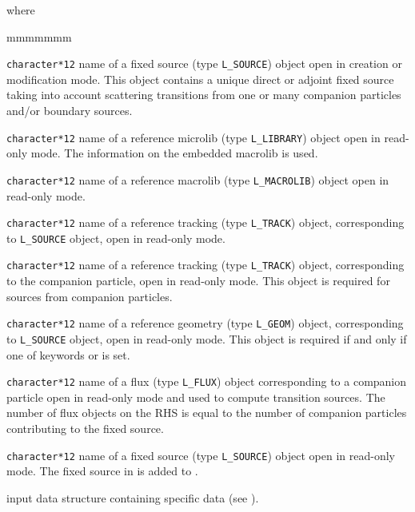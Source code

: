 \noindent where
\begin{ListeDeDescription}{mmmmmmm}

\item[\dusa{SOURCE}] {\tt character*12} name of a {\sc fixed source} (type {\tt L\_SOURCE}) object open in creation or modification
mode. This object contains a unique direct or adjoint fixed source taking into account scattering transitions from one or many companion particles and/or boundary sources.

\item[\dusa{MICRO}] {\tt character*12} name of a reference {\sc microlib} (type {\tt L\_LIBRARY}) object open in read-only mode. The information on
the embedded macrolib is used.

\item[\dusa{MACRO}] {\tt character*12} name of a reference {\sc macrolib} (type {\tt L\_MACROLIB}) object open in read-only mode.

\item[\dusa{TRACK}] {\tt character*12} name of a reference {\sc tracking} (type {\tt L\_TRACK}) object, corresponding to {\tt L\_SOURCE} object, open in read-only mode.

\item[\dusa{TRACK2}] {\tt character*12} name of a reference {\sc tracking} (type {\tt L\_TRACK}) object, corresponding to the companion particle, open in read-only mode. This object is required for sources from companion particles.

\item[\dusa{GEONAM}] {\tt character*12} name of a reference {\sc geometry} (type {\tt L\_GEOM}) object, corresponding to {\tt L\_SOURCE} object, open in read-only mode. This
object is required if and only if one of keywords  or  is set.

\item[\dusa{FLUX}] {\tt character*12} name of a {\sc flux} (type {\tt L\_FLUX}) object corresponding to a companion particle open in read-only mode and used to
compute transition sources. The number of {\sc flux} objects on the RHS is equal to the number of companion particles contributing to the fixed source.

\item[\dusa{SOURCE2}] {\tt character*12} name of a {\sc fixed source} (type {\tt L\_SOURCE}) object open in read-only mode. The fixed source in  is
added to .

\item[\dusa{PSOUR\_data}] input data structure containing specific data (see ).

\end{ListeDeDescription}
\eject

